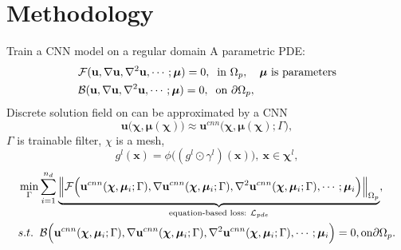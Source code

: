 \documentclass{beamer}
\begin{document}
\section{Methodology}
\begin{frame}{Train a CNN model on a regular domain}
A parametric PDE:
\begin{equation*}
\label{eqn:generalSteadyPDE}
\begin{split}
&\mathcal{F}(\mathbf{u},\nabla\mathbf{u}, \nabla^2 \mathbf{u}, \cdots; \boldsymbol{\mu})=0,\;\;\text{in }\Omega_{p}, \quad {\ensuremath{\boldsymbol{\mu}}} \text{ is parameters} \\
&\mathcal{B}(\mathbf{u},\nabla\mathbf{u}, \nabla^2 \mathbf{u}, \cdots; \boldsymbol{\mu})=0,\;\;\text{on }\partial\Omega_{p},
\end{split}
\end{equation*}
Discrete solution field on can be approximated by a CNN
\begin{equation*}
\label{eqn:cnn-approx}
\mathbf{u}\Big(\boldsymbol{\chi}, \boldsymbol{\mu}(\boldsymbol{\chi})\Big) \approx  \mathbf{u}^{cnn}\Big(\boldsymbol{\chi}, \boldsymbol{\mu}(\boldsymbol{\chi}); \Gamma\Big),
\end{equation*}
$\Gamma$ is trainable filter, $\chi$ is a mesh,
\begin{equation*}
g^l(\mathbf{x}) = \phi\Big((g^{l}\odot \gamma^{l})(\mathbf{x})\Big), \  \mathbf{x} \in \boldsymbol{\chi}^l,
\end{equation*}
\begin{equation*}
\scriptscriptstyle{\label{eqn:pdetraining}
	\begin{split}
	&\min_{\Gamma} \sum_{i=1}^{n_d}
	\underbrace{\left\|
		\mathcal{F}\Big(\mathbf{u}^{cnn}(\boldsymbol{\chi}, \boldsymbol{\mu}_i; \Gamma),
		\nabla\mathbf{u}^{cnn}(\boldsymbol{\chi}, \boldsymbol{\mu}_i; \Gamma), 
		\nabla^2\mathbf{u}^{cnn}(\boldsymbol{\chi}, \boldsymbol{\mu}_i; \Gamma), \cdots; \boldsymbol{\mu}_i\Big) \right\|_{\Omega_{p}}}_{\text{equation-based loss:}\ \mathcal{L}_{pde}},\\
	&s.t.\;\; \mathcal{B}\Big(\mathbf{u}^{cnn}(\boldsymbol{\chi}, \boldsymbol{\mu}_i; \Gamma),
	\nabla\mathbf{u}^{cnn}(\boldsymbol{\chi}, \boldsymbol{\mu}_i; \Gamma), 
	\nabla^2\mathbf{u}^{cnn}(\boldsymbol{\chi}, \boldsymbol{\mu}_i; \Gamma), \cdots;
	\boldsymbol{\mu}_i\Big)=0,\text{on}\partial\Omega_{p}.
	\end{split}
}
\end{equation*}
\end{frame}
\end{document}

